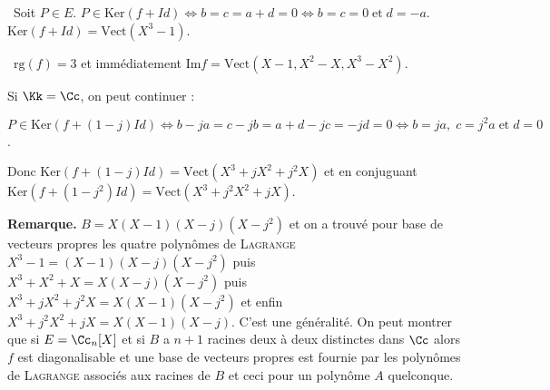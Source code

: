 {{\textbullet~Soit $P\in E$. $P\in\text{Ker}(f+Id)\Leftrightarrow b=c=a+d = 0\Leftrightarrow b=c=0\;\text{et}\;d=-a$. $\text{Ker}(f+Id)= \text{Vect}(X^3-1)$.

\textbullet~$\text{rg}(f) = 3$ et immédiatement $\text{Im}f =\text{Vect}(X-1,X^2-X,X^3-X^2)$.

Si $\Kk=\Cc$, on peut continuer :

$P\in\text{Ker}(f+(1-j)Id)\Leftrightarrow b-ja = c-jb = a + d - jc = - jd = 0\Leftrightarrow b = ja,\;c = j^2a\;\text{et}\;d=0$.

Donc  
$\text{Ker}(f+(1-j)Id)=\text{Vect}(X^3+jX^2+j^2X)$ et en conjuguant $\text{Ker}(f+(1-j^2)Id) =\text{Vect}(X^3+j^2X^2+jX)$.

\textbf{Remarque.} $B =X(X-1)(X-j)(X-j^2)$ et on a trouvé pour base de vecteurs propres les quatre polynômes de \textsc{Lagrange} $X^3-1 = (X-1)(X-j)(X-j^2)$ puis $X^3+X^2+X = X(X-j)(X-j^2)$ puis $X^3+jX^2+j^2X =X(X-1)(X-j^2)$ et enfin $X^3+j^2X^2+jX = X(X-1)(X-j )$. C'est une généralité. On peut montrer que si $E =\Cc_n[X]$ et si $B$ a $n+1$ racines deux à deux distinctes dans $\Cc$ alors $f$ est diagonalisable et une base de vecteurs propres est fournie par les polynômes de \textsc{Lagrange} associés aux racines de $B$ et ceci pour un polynôme $A$ quelconque.}
}
